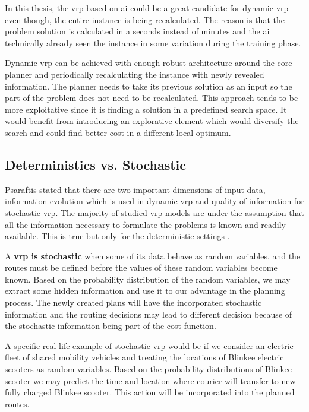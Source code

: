     In this thesis, the \gls{vrp} based on \gls{ai} could be a great candidate for dynamic \gls{vrp} even though, the entire instance is being recalculated. The reason is that the problem solution is calculated in a seconds instead of minutes and the \gls{ai} technically already seen the instance in some variation during the training phase.
    
    Dynamic \gls{vrp} can be achieved with enough robust architecture around the core planner and periodically recalculating the instance with newly revealed information. The planner needs to take its previous solution as an input so the part of the problem does not need to be recalculated. This approach tends to be more exploitative since it is finding a solution in a predefined search space. It would benefit from introducing an explorative element which would diversify the search and could find better cost in a different local optimum.

    \subsection{Deterministics vs. Stochastic}\label{dynamic}
    Psaraftis \cite{psaraftis} stated that there are two important dimensions of input data, information evolution which is used in dynamic \gls{vrp} and quality of information for stochastic \gls{vrp}. The majority of studied \gls{vrp} models are under the assumption that all the information necessary to formulate the problems is known and readily available. This is true but only for the deterministic settings \cite{vrp-bible}.
    
    A \textbf{\gls{vrp} is stochastic} \cite{stochastic-vrp} when some of its data behave as random variables, and the routes must be defined before the values of these random variables become known. Based on the probability distribution of the random variables, we may extract some hidden information and use it to our advantage in the planning process. The newly created plans will have the incorporated stochastic information and the routing decisions may lead to different decision because of the stochastic information being part of the cost function.
    
    A specific real-life example of stochastic \gls{vrp} would be if we consider an electric fleet of shared mobility vehicles and treating the locations of Blinkee electric scooters as random variables. Based on the probability distributions of Blinkee scooter we may predict the time and location where courier will transfer to new fully charged Blinkee scooter. This action will be incorporated into the planned routes.
    
